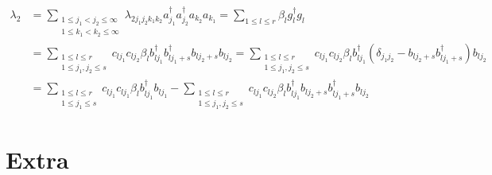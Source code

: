 \documentclass[aps,preprint]{revtex4}%
\begin{document}
\begin{align}
\lambda_{2}  &  =\sum_{\substack{1\leq j_{1}<j_{2}\leq\infty\\1\leq
k_{1}<k_{2}\leq\infty}}\lambda_{2j_{1}j_{2}k_{1}k_{2}}a_{j_{1}}^{\dagger
}a_{j_{2}}^{\dagger}a_{k_{2}}a_{k_{1}}=\sum_{1\leq l\leq r}\beta_{l}%
g_{l}^{\dagger}g_{l}\nonumber\\
&  =\sum_{\substack{1\leq l\leq r\\1\leq j_{1},j_{2}\leq s}}c_{lj_{1}%
}c_{lj_{2}}\beta_{l}b_{lj_{1}}^{\dagger}b_{lj_{1}+s}^{\dagger}b_{lj_{2}%
+s}b_{lj_{2}}=\sum_{\substack{1\leq l\leq r\\1\leq j_{1},j_{2}\leq
s}}c_{lj_{1}}c_{lj_{2}}\beta_{l}b_{lj_{1}}^{\dagger}\left(  \delta_{j_{1}%
j_{2}}-b_{lj_{2}+s}b_{lj_{1}+s}^{\dagger}\right)  b_{lj_{2}}\nonumber\\
&  =\sum_{\substack{1\leq l\leq r\\1\leq j_{1}\leq s}}c_{lj_{1}}c_{lj_{1}%
}\beta_{l}b_{lj_{1}}^{\dagger}b_{lj_{1}}-\sum_{\substack{1\leq l\leq r\\1\leq
j_{1},j_{2}\leq s}}c_{lj_{1}}c_{lj_{2}}\beta_{l}b_{lj_{1}}^{\dagger}%
b_{lj_{2}+s}b_{lj_{1}+s}^{\dagger}b_{lj_{2}}%
\end{align}


\section{Extra}
\end{document}
